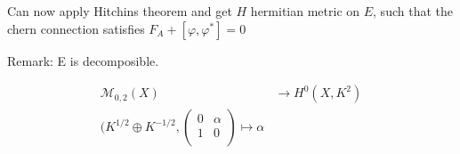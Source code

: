 Can now apply Hitchins theorem and get $ H$ hermitian metric on $E$, 
such that the chern connection satisfies $F_A + [\varphi, \varphi^* ] = 0 $ 

Remark: 
E is decomposible. 

\begin{align}
    \mathcal{M} _ {0,2} ( X) & \rightarrow H^0 (X, K ^2) \\
    ( K ^{1/2} \oplus K^{-1/2} , \left(\begin{array}{rr}
        0 & \alpha \\
        1 & 0 \\ 
    \end{array} \right) \mapsto \alpha 
\end{align}










 

